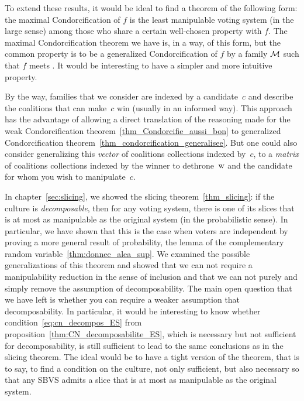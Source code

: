 To extend these results, it would be ideal to find a theorem of the following form: the maximal Condorcification of $ f $ is the least manipulable voting system (in the large sense) among those who share a certain well-chosen property with $ f $. The maximal Condorcification theorem we have is, in a way, of this form, but the common property is to be a generalized Condorcification of $ f $ by a family $ \mathcal{M} $ such that $ f $ meets \cminf{}. It would be interesting to have a simpler and more intuitive property.

By the way, families that we consider are indexed by a candidate~$ c $ and describe the coalitions that can make~$ c $ win (usually in an informed way). This approach has the advantage of allowing a direct translation of the reasoning made for the weak Condorcification theorem~\ref{thm_Condorcifie_aussi_bon} to generalized Condorcification theorem~\ref{thm_condorcification_generalisee}. But one could also consider generalizing this \emph{vector} of coalitions collections indexed by~$ c $, to a \emph{matrix} of coalitions collections indexed by the winner to dethrone~$\mathrm{w} $ and the candidate for whom you wish to manipulate~$ c $.

\medskip
In chapter~\ref{sec:slicing}, we showed the slicing theorem~\ref{thm_slicing}: if the culture is \emph{decomposable}, then for any voting system, there is one of its slices that is at most as manipulable as the original system (in the probabilistic sense). In particular, we have shown that this is the case when voters are independent by proving a more general result of probability, the lemma of the complementary random variable~\ref{thm:donnee_alea_sup}. We examined the possible generalizations of this theorem and showed that we can not require a manipulability reduction in the sense of inclusion and that we can not purely and simply remove the assumption of decomposability. The main open question that we have left is whether you can require a weaker assumption that decomposability. In particular, it would be interesting to know whether condition~\eqref{eq:cn_decompos_ES} from proposition~\ref{thm:CN_decomposabilite_ES}, which is necessary but not sufficient for decomposability, is still sufficient to lead to the same conclusions as in the slicing theorem. The ideal would be to have a tight version of the theorem, that is to say, to find a condition on the culture, not only sufficient, but also necessary so that any SBVS admits a slice that is at most as manipulable as the original system.

